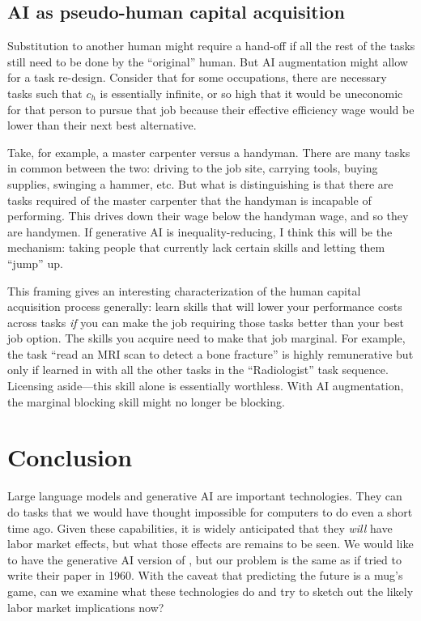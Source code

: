 \documentclass{article}
\begin{document}
\subsection{AI as pseudo-human capital acquisition}
Substitution to another human might require a hand-off if all the rest of the tasks still need to be done by the ``original'' human. 
But AI augmentation might allow for a task re-design. 
Consider that for some occupations, there are necessary tasks such that $c_h$ is essentially infinite, or so high that it would be uneconomic for that person to pursue that job because their effective efficiency wage would be lower than their next best alternative.  

Take, for example, a master carpenter versus a handyman.
There are many tasks in common between the two: driving to the job site, carrying tools, buying supplies, swinging a hammer, etc.
But what is distinguishing is that there are tasks required of the master carpenter that the handyman is incapable of performing. 
This drives down their wage below the handyman wage, and so they are handymen.
If generative AI is inequality-reducing, I think this will be the mechanism: taking people that currently lack certain skills and letting them ``jump'' up. 

This framing gives an interesting characterization of the human capital acquisition process  generally: learn skills that will lower your performance costs across tasks \emph{if} you can make the job requiring those tasks better than your best job option.
The skills you acquire need to make that job marginal. 
For example, the task ``read an MRI scan to detect a bone fracture'' is highly remunerative but only if learned in with all the other tasks in the ``Radiologist'' task sequence.
Licensing aside---this skill alone is essentially worthless.  
With AI augmentation, the marginal blocking skill might no longer be blocking. 

\section{Conclusion}
Large language models and generative AI are important technologies. 
They can do tasks that we would have thought impossible for computers to do even a short time ago.
Given these capabilities, it is widely anticipated that they \emph{will} have labor market effects, but what those effects are remains to be seen. 
We would like to have the generative AI version of \cite{autor2003skill}, but our problem is the same as if \cite{autor2003skill} tried to write their paper in 1960.
With the caveat that predicting the future is a mug's game, can we examine what these technologies do and try to sketch out the likely labor market implications now? 
\end{document}
